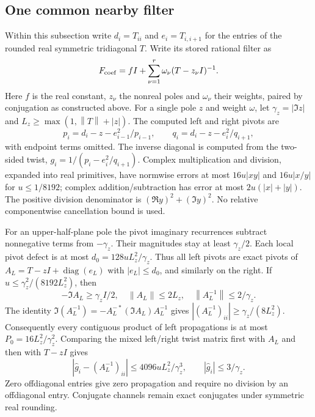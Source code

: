 \documentclass[11pt]{article}
\theoremstyle{remark}\newtheorem{remark}[theorem]{Remark}
\newcommand{\norm}[1]{\left\lVert#1\right\rVert}
\newcommand{\abs}[1]{\left\lvert#1\right\rvert}
\DeclareMathOperator{\diag}{diag}
\begin{document}
\subsection{One common nearby filter}
Within this subsection write $d_i=T_{ii}$ and $e_i=T_{i,i+1}$ for
the entries of the rounded real symmetric tridiagonal $T$. Write its
stored rational filter as
\[ F_{\rm coef}=fI+\sum_{\nu=1}^r\omega_\nu(T-z_\nu I)^{-1}. \]
Here $f$ is the real constant, $z_\nu$ the nonreal poles and
$\omega_\nu$ their weights, paired by conjugation as constructed above.
For a single pole $z$ and weight $\omega$, let
$\gamma_z=\abs{\Im z}$ and $L_z\ge\max(1,\norm T+\abs z)$.
The computed left and right pivots are
\begin{equation}\label{eq:pivots}
 p_i=d_i-z-e_{i-1}^2/p_{i-1},\qquad
 q_i=d_i-z-e_i^2/q_{i+1},
\end{equation}
with endpoint terms omitted. The inverse diagonal is computed from the
two-sided twist, $g_i=1/(p_i-e_i^2/q_{i+1})$.
Complex multiplication and division, expanded into real primitives, have
normwise errors at most $16u\abs{xy}$ and $16u\abs{x/y}$ for
$u\le1/8192$; complex addition/subtraction has error at most
$2u(\abs x+\abs y)$. The positive division denominator is
$(\Re y)^2+(\Im y)^2$. No relative componentwise cancellation bound is used.

For an upper-half-plane pole the pivot imaginary recurrences subtract
nonnegative terms from $-\gamma_z$. Their magnitudes stay at least
$\gamma_z/2$. Each local pivot defect is at most
$d_0=128uL_z^2/\gamma_z$. Thus all left pivots are exact pivots of
$A_L=T-zI+\diag(e_L)$ with $\abs{e_L}\le d_0$, and similarly on the right.
If $u\le\gamma_z^2/(8192L_z^2)$, then
\[
 -\Im A_L\ge\gamma_zI/2,\quad \norm{A_L}\le2L_z,\quad
 \norm{A_L^{-1}}\le2/\gamma_z.
\]
The identity
$\Im(A_L^{-1})=-A_L^{-*}(\Im A_L)A_L^{-1}$ gives
$\abs{(A_L^{-1})_{ii}}\ge\gamma_z/(8L_z^2)$. Consequently every
contiguous product of left propagations is at most
$P_0=16L_z^2/\gamma_z^2$. Comparing the mixed left/right twist matrix
first with $A_L$ and then with $T-zI$ gives
\begin{equation}\label{eq:twist}
 \abs{\widehat g_i-(A_L^{-1})_{ii}}
 \le4096uL_z^2/\gamma_z^3,\qquad \abs{\widehat g_i}\le3/\gamma_z.
\end{equation}
Zero offdiagonal entries give zero propagation and require no division by an
offdiagonal entry. Conjugate channels remain exact conjugates under symmetric
real rounding.
\end{document}
